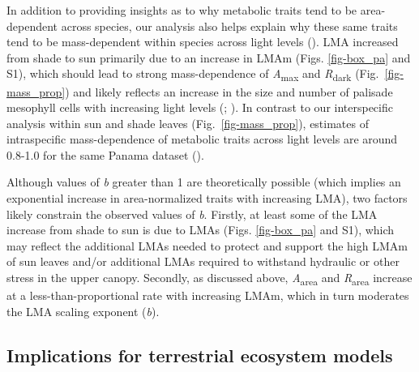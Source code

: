 \documentclass[
  12pt,
  letterpaper,
  DIV=11,
  numbers=noendperiod]{scrartcl}
\begin{document}
In addition to providing insights as to why metabolic traits tend to be
area-dependent across species, our analysis also helps explain why these
same traits tend to be mass-dependent within species across light levels
(). LMA increased from shade
to sun primarily due to an increase in LMAm (Figs. \ref{fig-box_pa} and
S1), which should lead to strong mass-dependence of
\emph{A}\textsubscript{max} and \emph{R}\textsubscript{dark}
(Fig.~\ref{fig-mass_prop}) and likely reflects an increase in the size
and number of palisade mesophyll cells with increasing light levels
(;
). In contrast to
our interspecific analysis within sun and shade leaves
(Fig.~\ref{fig-mass_prop}), estimates of intraspecific mass-dependence
of metabolic traits across light levels are around 0.8-1.0 for the same
Panama dataset ().

Although values of \emph{b} greater than 1 are theoretically possible
(which implies an exponential increase in area-normalized traits with
increasing LMA), two factors likely constrain the observed values of
\emph{b}. Firstly, at least some of the LMA increase from shade to sun
is due to LMAs (Figs. \ref{fig-box_pa} and S1), which may reflect the
additional LMAs needed to protect and support the high LMAm of sun
leaves and/or additional LMAs required to withstand hydraulic or other
stress in the upper canopy. Secondly, as discussed above,
\emph{A}\textsubscript{area} and \emph{R}\textsubscript{area} increase
at a less-than-proportional rate with increasing LMAm, which in turn
moderates the LMA scaling exponent (\emph{b}).

\subsection{Implications for terrestrial ecosystem
models}\label{implications-for-terrestrial-ecosystem-models}
\end{document}
